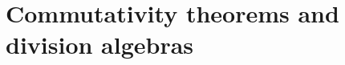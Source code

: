 \documentclass[12pt,oneside]{amsproc}
\newcommand{\customref}[1]{\ref{#1}}
\begin{document}
\part{Commutativity theorems and division algebras}






%
\newpage 



\printindex
\end{document}
